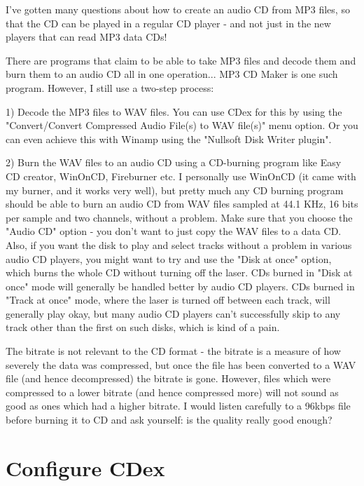 I've gotten many questions about how to create an audio CD from MP3 files, so
that the CD can be played in a regular
CD player - and not just in the new players that can read MP3 data CDs!

There are programs that claim to be able to take MP3 files and decode them and burn them to an audio CD
all in one operation... MP3 CD Maker is one such program. However, I still use a two-step process:

1) Decode the MP3 files to WAV files. You can use CDex for this by using the "Convert/Convert Compressed Audio File(s) to WAV file(s)"
menu option. Or you can even achieve this with Winamp using the "Nullsoft Disk Writer plugin".


2) Burn the WAV files to an audio CD using a CD-burning program like Easy CD creator, WinOnCD, 
Fireburner etc. I personally use WinOnCD (it came with my burner, and it works very well), 
but pretty much any CD burning program should be able to burn an audio CD from WAV files 
sampled at 44.1 KHz, 16 bits per sample and two channels, without a problem. Make sure that you choose 
the "Audio CD" option - you don't want to just copy the WAV files to a data CD. Also, if you want the disk to play 
and select tracks without a problem in various audio CD players, you might want to try and use 
the "Disk at once" option, which burns the whole CD without turning off the laser. CDs burned 
in "Disk at once" mode will generally be handled better by audio CD players. CDs burned in 
"Track at once" mode, where the laser is turned off between each track, will generally 
play okay, but many audio CD players can't successfully skip to any track other than the first 
on such disks, which is kind of a pain.

The bitrate is not relevant to the CD format - the bitrate is a measure of how 
severely the data was compressed, but once the file has been converted to a WAV 
file (and hence decompressed) the bitrate is gone. However, files which were 
compressed to a lower bitrate (and hence compressed more) will not sound as good 
as ones which had a higher bitrate.  I would listen carefully to a 96kbps file 
before burning it to CD and ask yourself: is the quality really good enough?

\chapter{Configure CDex}\label{configurecdex}
\setfooter{\thepage}{}{}{}{}{\thepage}

